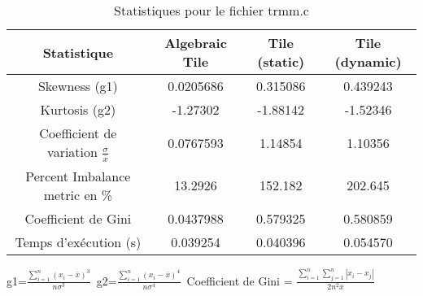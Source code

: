 \documentclass{article}
\begin{document}
\begin{table}[htbp]
  \centering
  \caption{Statistiques pour le fichier trmm.c}
  \begin{tabular}{|c|c|c|c|}
    \hline
    Statistique & Algebraic Tile & Tile (static) & Tile (dynamic) \\ 
    \hline
    Skewness (g1)  & 0.0205686 & 0.315086 & 0.439243 \\ 
    Kurtosis (g2)  & -1.27302 & -1.88142 & -1.52346 \\ 
    Coefficient de variation $ \frac{\sigma}{\overline{x}} $ & 0.0767593 & 1.14854 & 1.10356\\ 
    Percent Imbalance metric en \% & 13.2926 & 152.182 & 202.645\\ 
    Coefficient de Gini  & 0.0437988 & 0.579325 & 0.580859\\ 
    Temps d'exécution (s) &  0.039254    &  0.040396   &  0.054570   \\ 

    \hline
  \end{tabular}
\end{table}
g1=$ \frac{\sum_{i=1}^{n} (x_i - \overline{x})^3}{n\sigma^3} $\
g2=$ \frac{\sum_{i=1}^{n} (x_i - \overline{x})^4}{n\sigma^4} $\
Coefficient de Gini = $ \frac{\sum_{i=1}^{n}\sum_{j=1}^{n} |x_i - x_j|}{2n^2\overline{x}} $\
\newpage
\end{document}
